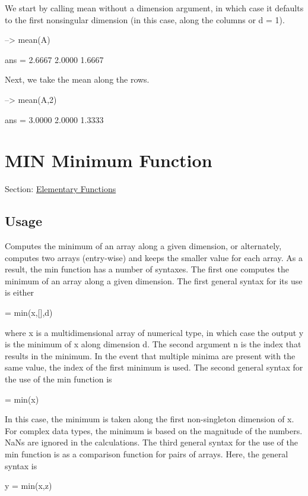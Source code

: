 We start by calling {\ttfamily mean} without a dimension argument, in which case it defaults to the first nonsingular dimension (in this case, along the columns or {\ttfamily d = 1}).


\begin{DoxyVerbInclude}
--> mean(A)

ans = 
    2.6667    2.0000    1.6667 
\end{DoxyVerbInclude}


Next, we take the mean along the rows.


\begin{DoxyVerbInclude}
--> mean(A,2)

ans = 
    3.0000 
    2.0000 
    1.3333 
\end{DoxyVerbInclude}
 \hypertarget{elementary_min}{}\section{M\-I\-N Minimum Function}\label{elementary_min}
Section\-: \hyperlink{sec_elementary}{Elementary Functions} \hypertarget{vtkwidgets_vtkxyplotwidget_Usage}{}\subsection{Usage}\label{vtkwidgets_vtkxyplotwidget_Usage}
Computes the minimum of an array along a given dimension, or alternately, computes two arrays (entry-\/wise) and keeps the smaller value for each array. As a result, the {\ttfamily min} function has a number of syntaxes. The first one computes the minimum of an array along a given dimension. The first general syntax for its use is either \begin{DoxyVerb}   [y,n] = min(x,[],d)
\end{DoxyVerb}
 where {\ttfamily x} is a multidimensional array of numerical type, in which case the output {\ttfamily y} is the minimum of {\ttfamily x} along dimension {\ttfamily d}. The second argument {\ttfamily n} is the index that results in the minimum. In the event that multiple minima are present with the same value, the index of the first minimum is used. The second general syntax for the use of the {\ttfamily min} function is \begin{DoxyVerb}   [y,n] = min(x)
\end{DoxyVerb}
 In this case, the minimum is taken along the first non-\/singleton dimension of {\ttfamily x}. For complex data types, the minimum is based on the magnitude of the numbers. Na\-Ns are ignored in the calculations. The third general syntax for the use of the {\ttfamily min} function is as a comparison function for pairs of arrays. Here, the general syntax is \begin{DoxyVerb}   y = min(x,z)
\end{DoxyVerb}
